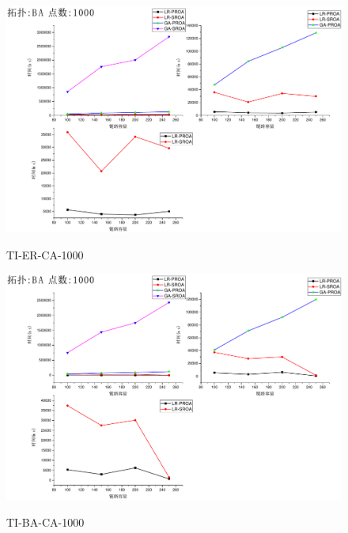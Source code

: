 \begin{figure}
\setlength{\belowcaptionskip}{-0.1cm}
  \begin{center}
    {\includegraphics[width=1 \textwidth]{figures/TI-ER-CA-1000.pdf}}
    \end{center}
  \caption{{\footnotesize{TI-ER-CA-1000}}}
  \label{TI-ER-CA-1000}
\end{figure}
\begin{figure}
\setlength{\belowcaptionskip}{-0.1cm}
  \begin{center}
    {\includegraphics[width=1 \textwidth]{figures/TI-BA-CA-1000.pdf}}
    \end{center}
  \caption{{\footnotesize{TI-BA-CA-1000}}}
  \label{TI-BA-CA-1000}
\end{figure}
